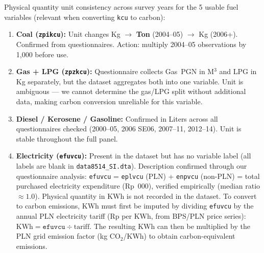 \documentclass[11pt, a4paper]{article}
\begin{document}
\vspace{1em}

\begin{tcolorbox}[
  colframe=warnamber, colback=yellow!12!white,
  boxrule=1.2pt, arc=3pt,
  left=8pt, right=8pt, top=6pt, bottom=6pt,
  title={\color{warnamber}\textbf{Need to Confirm}},
  fonttitle=\bfseries, colbacktitle=yellow!20!white, coltitle=warnamber,
  titlerule=0.5pt]
Physical quantity unit consistency across survey years for the 5 usable fuel variables
(relevant when converting \texttt{kcu} to carbon):
\begin{enumerate}[noitemsep, topsep=4pt]
  \item \textbf{Coal (\texttt{zpikcu}):} Unit changes Kg $\to$ \textbf{Ton} (2004--05)
        $\to$ Kg (2006+). Confirmed from questionnaires. Action: multiply 2004--05
        observations by 1{,}000 before use.
  \item \textbf{Gas + LPG (\texttt{zpzkcu}):} Questionnaire collects Gas~PGN in M$^3$
        and LPG in Kg separately, but the dataset aggregates both into one variable.
        Unit is ambiguous --- we cannot determine the gas/LPG split without additional
        data, making carbon conversion unreliable for this variable.
  \item \textbf{Diesel / Kerosene / Gasoline:} Confirmed in Liters across all
        questionnaires checked (2000--05, 2006 SE06, 2007--11, 2012--14).
        Unit is stable throughout the full panel.
  \item \textbf{Electricity (\texttt{efuvcu}):} Present in the dataset but has no
        variable label (all labels are blank in \texttt{data8514\_SI.dta}).
        Description confirmed through our questionnaire analysis:
        \texttt{efuvcu} = \texttt{eplvcu} (PLN) + \texttt{enpvcu} (non-PLN) =
        total purchased electricity expenditure (Rp~000), verified empirically
        (median ratio $\approx 1.0$).
        Physical quantity in KWh is not recorded in the dataset.
        To convert to carbon emissions, KWh must first be imputed by dividing
        \texttt{efuvcu} by the annual PLN electricity tariff
        (Rp per KWh, from BPS/PLN price series):
        $\text{KWh} = \texttt{efuvcu} \div \text{tariff}$.
        The resulting KWh can then be multiplied by the PLN grid emission factor
        (kg CO$_2$/KWh) to obtain carbon-equivalent emissions.
\end{enumerate}
\end{tcolorbox}

\clearpage
\end{document}
